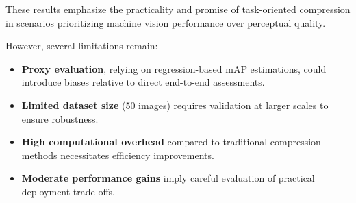 \documentclass[conference]{IEEEtran}
\begin{document}
These results emphasize the practicality and promise of task-oriented compression in scenarios prioritizing machine vision performance over perceptual quality.

However, several limitations remain:
\begin{itemize}
\item \textbf{Proxy evaluation}, relying on regression-based mAP estimations, could introduce biases relative to direct end-to-end assessments.
\item \textbf{Limited dataset size} (50 images) requires validation at larger scales to ensure robustness.
\item \textbf{High computational overhead} compared to traditional compression methods necessitates efficiency improvements.
\item \textbf{Moderate performance gains} imply careful evaluation of practical deployment trade-offs.
\end{itemize}
\end{document}
